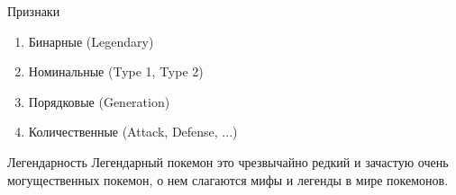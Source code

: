 \documentclass[10pt]{beamer}
\begin{document}
\begin{frame}{Признаки}
	\begin{enumerate} [-]	
		\item Бинарные (Legendary)
		\item Номинальные (Type 1, Type 2)
		\item Порядковые (Generation)
		\item Количественные (Attack, Defense, ...)
	\end{enumerate}
\end{frame}

\begin{frame}{Легендарность}
\alert{Легендарный покемон} это чрезвычайно редкий и зачастую очень могущественных покемон, о нем слагаются мифы и легенды в мире покемонов.
\end{frame}
\end{document}
